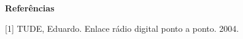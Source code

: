 \begin{center}
	\Large \textbf{Referências}
\end{center}
	
	[1] TUDE, Eduardo. Enlace rádio digital ponto a ponto. 2004.
